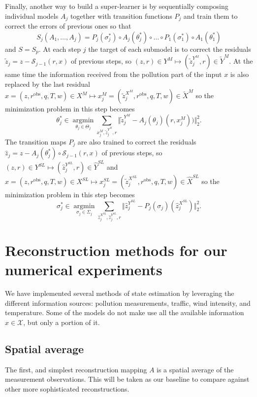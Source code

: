 \documentclass[11pt,a4paper,twoside]{article}
\newcommand{\asmodif}[2]{{\color{teal} #1} {\sout{#2}}}
\theoremstyle{definition}
\numberwithin{equation}{section}
\newcommand{\cS}{\ensuremath{\mathcal{S}}}
\newcommand{\cX}{\ensuremath{\mathcal{X}}}
\newcommand{\<}{\langle}
\renewcommand{\>}{\rangle}
\newcommand{\argmin}{\operatorname{argmin}}
\newcommand{\obs}{\ensuremath{\text{obs}}}
\begin{document}
\asmodif{
Finally, another way to build a super-learner is by sequentially composing individual models $A_j$ together with transition functions $P_j$ and train them to correct the errors of previous ones so that 
$$
S_j(A_1, \dots, A_j) = P_j(\sigma_j^*) \circ A_j(\theta_j^*) \circ \dots \circ P_1(\sigma_1^*) \circ A_1(\theta_1^*)
$$
and $S=S_p$. At each step $j$ the target of each submodel is to correct the residuals $\tilde z_j=z - \cS_{j-1}(r, x)$ of previous steps, so $(z, r)\in Y^{M} \mapsto (\tilde z_j^{Y^{M}}, r) \in \tilde Y^{M}$. At the same time the information received from the pollution part of the input $x$ is also replaced by the last residual $x = (z, r^\obs, q, T, w) \in X^{M} \mapsto x_j^M = (\tilde z_j^{X^{M}}, r^\obs, q, T, w) \in \tilde X^{M}$ so the minimization problem in this step becomes
$$
\theta_j^* \in \underset{\theta_j \in \Theta_j}{\argmin}
\sum_{x_j^M, \tilde z_j^{Y^{M}}, r}
\Vert \tilde z_j^{Y^{M}} - A_j(\theta_j)(r, x_j^M)) \Vert^2_2.
$$
The transition maps $P_j$ are also trained to correct the residuals $\hat z_j=z - A_j(\theta_j^*)\circ\cS_{j-1}(r, x)$ of previous steps, so $(z, r)\in Y^{SL} \mapsto (\hat z_j^{Y^{SL}}, r) \in \hat Y^{SL}$ and $x = (z, r^\obs, q, T, w) \in X^{SL} \mapsto x_j^{SL} = (\tilde z_j^{X^{SL}}, r^\obs, q, T, w)  \in \hat X^{SL}$ so the minimization problem in this step becomes
$$
\sigma_j^* \in \underset{\sigma_j \in \Sigma_j}{\argmin}
\sum_{\hat z_j^{X^{SL}}, \hat z_j^{Y^{SL}}, r}
\Vert \hat z_j^{Y^{SL}} - P_j(\sigma_j)(\hat z_j^{X^{SL}}) \Vert^2_2.
$$
}{}


\section{Reconstruction methods for our numerical experiments}
\label{sec:concrete-methods}
We have implemented several methods of state estimation by leveraging the different information sources: pollution measurements, traffic, wind intensity, and temperature. Some of the models do not make use all the available information $x\in \cX$, but only a portion of it. 

\subsection{Spatial average}
\label{sec:snapshotmean}
The first, and simplest reconstruction mapping $A$ is a spatial average of the measurement observations. This will be taken as our baseline to compare against other more sophisticated reconstructions.
\end{document}
